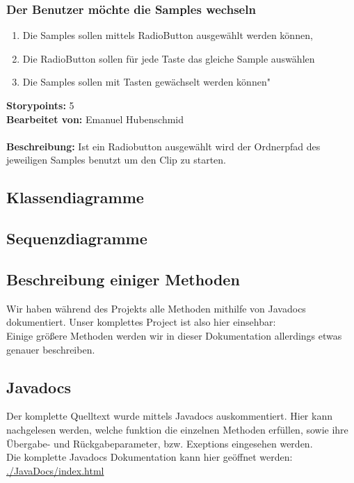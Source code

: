 \subsubsection{Der Benutzer möchte die Samples wechseln}

\begin{enumerate}
 \item Die Samples sollen mittels RadioButton ausgewählt werden können,
 \item Die RadioButton sollen für jede Taste das gleiche Sample auswählen
 \item Die Samples sollen mit Tasten gewächselt werden können"
\end{enumerate}

\textbf{Storypoints:} 5 \\
\textbf{Bearbeitet von:} Emanuel Hubenschmid \\
\\
\textbf{Beschreibung:} Ist ein Radiobutton ausgewählt wird der Ordnerpfad 
des jeweiligen Samples benutzt um den Clip zu starten.


\newpage


\subsection{Klassendiagramme}
\subsection{Sequenzdiagramme}


\subsection{Beschreibung einiger Methoden}




Wir haben während des Projekts alle Methoden mithilfe von Javadocs dokumentiert. Unser komplettes 
Project ist also hier einsehbar: %
\\

Einige größere Methoden werden wir in dieser Dokumentation allerdings etwas genauer beschreiben.

\subsection{Javadocs}
Der komplette Quelltext wurde mittels Javadocs auskommentiert. Hier kann nachgelesen werden, welche 
funktion die einzelnen Methoden erfüllen, sowie ihre Übergabe- und Rückgabeparameter, bzw. 
Exeptions  eingesehen werden.\\
Die komplette Javadocs Dokumentation kann hier geöffnet werden:\\
\url{./JavaDocs/index.html}